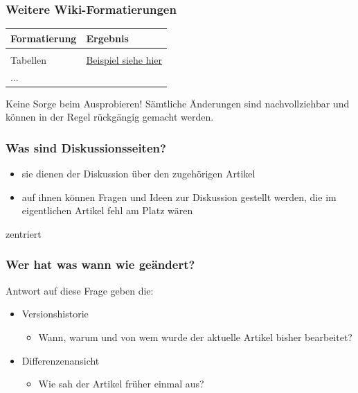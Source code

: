 \documentclass{beamer}
\begin{document}
\begin{frame}
  \frametitle{Weitere Wiki-Formatierungen}
  \begin{longtable}{|l|l|}
    \hline
    \textbf{Formatierung                                             } & \textbf{Ergebnis                       } \\ 
    \hline
     
     \\ 

    \hline
     
    Tabellen                             & \href{https://de.wikipedia.org/wiki/Hilfe:Tabellen}{Beispiel siehe hier} \\ 
    \hline
     
    \multicolumn{2}{|l|}{...} \\ 
    \hline
     
  \end{longtable}

  Keine Sorge beim Ausprobieren! Sämtliche Änderungen sind nachvollziehbar und können in der Regel rückgängig gemacht werden.
\end{frame}


\begin{frame}
  \frametitle{Was sind Diskussionsseiten?}

  \begin{itemize}
    \item sie dienen der Diskussion über den zugehörigen Artikel
    \item auf ihnen können Fragen und Ideen zur Diskussion gestellt werden,
      die im eigentlichen Artikel fehl am Platz wären
  \end{itemize}

  zentriert

\end{frame}


\begin{frame}
  \frametitle{Wer hat was wann wie geändert?}

  Antwort auf diese Frage geben die:
  \begin{itemize}
    \item Versionshistorie
    \begin{itemize}
      \item Wann, warum und von wem wurde der aktuelle Artikel bisher bearbeitet?
    \end{itemize}
    \item Differenzenansicht
    \begin{itemize}
      \item Wie sah der Artikel früher einmal aus?
    \end{itemize}
  \end{itemize}
\end{frame}
\end{document}
